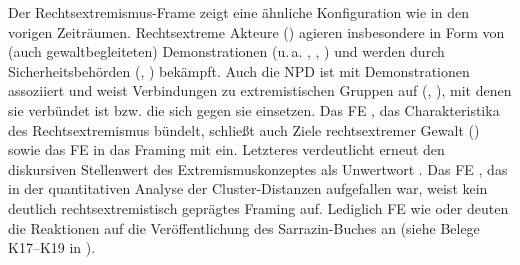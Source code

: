 Der Rechtsextremismus-Frame zeigt eine ähnliche Konfiguration wie in den vorigen Zeiträumen. Rechtsextreme Akteure () agieren insbesondere in Form von (auch gewaltbegleiteten) Demonstrationen (u.\,a. , , ) und werden durch Sicherheitsbehörden (, ) bekämpft. Auch die NPD ist mit Demonstrationen assoziiert und weist Verbindungen zu extremistischen Gruppen auf (, ), mit denen sie verbündet ist bzw. die sich gegen sie einsetzen. Das FE , das Charakteristika des Rechtsextremismus bündelt, schließt auch Ziele rechtsextremer Gewalt () sowie das FE  in das Framing mit ein. Letzteres verdeutlicht erneut den diskursiven Stellenwert des Extremismuskonzeptes als Unwertwort \autocite{burkhardtDeutscheSprachgeschichteUnd1998}. Das FE , das in der quantitativen Analyse der Cluster-Distanzen aufgefallen war, weist kein deutlich rechtsextremistisch geprägtes Framing auf. Lediglich FE wie  oder  deuten die Reaktionen auf die Veröffentlichung des Sarrazin-Buches an (siehe Belege K17--K19 in ).

